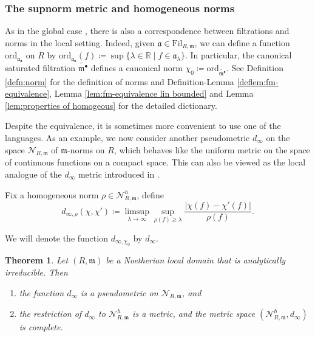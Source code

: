 \documentclass[11pt, leqno]{amsart}%
\theoremstyle{plain}
\newtheorem{theorem}{Theorem}[section]
\theoremstyle{definition}
\theoremstyle{remark}
\newcommand{\cN}{\mathcal{N}}
\newcommand{\bR}{\mathbb{R}}
\newcommand{\fa}{\mathfrak{a}}
\newcommand{\fm}{\mathfrak{m}}
\newcommand{\ord}{\mathrm{ord}}
\newcommand{\Fil}{\mathrm{Fil}}
\numberwithin{equation}{section}
\begin{document}
	
	
	
\subsubsection{The supnorm metric and homogeneous norms}\label{sssec:d_infty intro}
	
As in the global case \cite{BJ21}, there is also a correspondence between filtrations and norms in the local setting. Indeed, given $\fa\in\Fil_{R,\fm}$, we can define a function $\ord_{\fa_\bullet}$ on $R$ by $\ord_{\fa_\bullet}(f)\coloneqq \sup\{\lambda\in\bR\mid f\in \fa_\lambda\}$. In particular, the canonical saturated filtration $\widetilde{\fm^\bullet}$ defines a canonical norm $\chi_0\coloneqq \ord_{\widetilde{\fm^\bullet}}$. 
See Definition \ref{defn:norm} for the definition of norms and Definition-Lemma \ref{deflem:fm-equivalence}, Lemma \ref{lem:fm-equivalence lin bounded} and Lemma \ref{lem:properties of homogeous} for the detailed dictionary. 

Despite the equivalence, it is sometimes more convenient to use one of the languages. 
As an example, we now consider another pseudometric $d_\infty$ on the space $\cN_{R,\fm}$ of $\fm$-norms on $R$, which behaves like the uniform metric on the space of continuous functions on a compact space. This can also be viewed as the local analogue of the $d_\infty$ metric introduced in \cite{BJ21}. 
	
Fix a homogeneous norm $\rho\in\cN^h_{R,\fm}$, define 
\begin{equation}\label{eqn:d_infty metric}
    d_{\infty,\rho}(\chi,\chi')\coloneqq \limsup_{\lambda\to\infty} \sup_{\rho(f)\ge\lambda}\frac{|\chi(f)-\chi'(f)|}{\rho(f)}.
\end{equation}
	
We will denote the function $d_{\infty,\chi_0}$ by $d_\infty$.
\begin{theorem}\label{thm:d_infty metric}
    Let $(R,\fm)$ be a Noetherian local domain that is analytically irreducible. Then
		
    \begin{enumerate}
        \item the function $d_\infty$ is a pseudometric on $\cN_{R,\fm}$, and
			
        \item the restriction of $d_\infty$ to $\cN^h_{R,\fm}$ is a metric, and the metric space $(\cN^h_{R,\fm},d_\infty)$ is complete.
    \end{enumerate}
\end{theorem}
\end{document}
